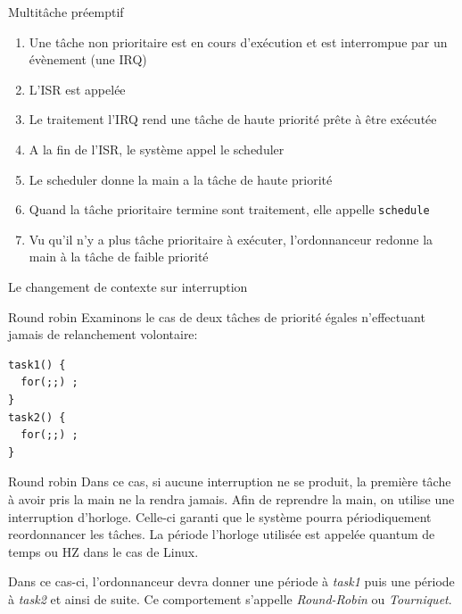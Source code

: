 \begin{frame}{Multitâche préemptif}
  \begin{enumerate}
  \item  Une tâche  non prioritaire  est en  cours d'exécution  et est
    interrompue par un évènement (une IRQ)
  \item L'ISR est appelée
  \item Le traitement  l'IRQ rend une tâche de  haute priorité prête à
    être exécutée
  \item A la fin de l'ISR, le système appel le scheduler
  \item Le scheduler donne la main a la tâche de haute priorité
  \item  Quand  la tâche  prioritaire  termine  sont traitement,  elle
    appelle \texttt{schedule}
  \item   Vu  qu'il  n'y   a  plus   tâche  prioritaire   à  exécuter,
    l'ordonnanceur redonne la main à la tâche de faible priorité
  \end{enumerate}
\end{frame}

\begin{frame}{Le changement de contexte sur interruption}
  \begin{center}
  \end{center}
\end{frame}

\begin{frame}[fragile]{Round robin}
  Examinons  le cas de  deux tâches  de priorité  égales n'effectuant
  jamais de relanchement volontaire:
  \begin{lstlisting}
task1() {
  for(;;) ;
}
task2() {
  for(;;) ;
}
  \end{lstlisting}
\end{frame}

\begin{frame}[fragile]{Round robin}
  Dans ce cas, si aucune interruption ne se produit, la première tâche
  à avoir pris la main ne la rendra jamais. Afin de reprendre la main,
  on  utilise une  interruption  d'horloge.  Celle-ci  garanti que  le
  système  pourra périodiquement  reordonnancer les  tâches.  La période
  l'horloge utilisée est appelée quantum de temps ou HZ dans le cas de
  Linux.

  Dans   ce  cas-ci,   l'ordonnanceur  devra   donner  une   période  à
  \emph{task1} puis une période à  \emph{task2} et ainsi de suite.  Ce
  comportement s'appelle \emph{Round-Robin} ou \emph{Tourniquet}.
  \begin{center}
    
  \end{center}
\end{frame}


